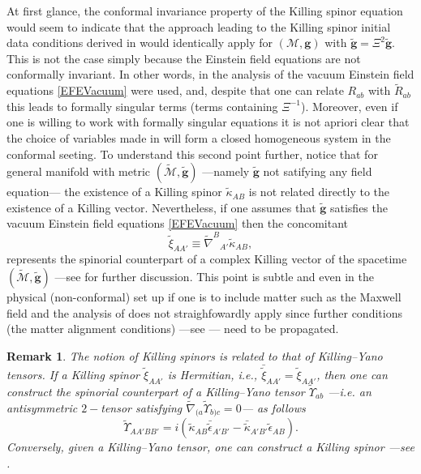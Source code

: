 \documentclass[10pt,a4paper]{article}
\theoremstyle{plain}
\newtheorem{remark}{Remark}
\def\bmg{{\bm g}}
\newcounter{mnotecount}%
\newcommand{\mnotex}[1]%
{\protect{\stepcounter{mnotecount}}$^{\mbox{\footnotesize $\bullet$\themnotecount}}$ 
\marginpar{%
\raggedright\tiny\em
$\!\!\!\!\!\!\,\bullet$\themnotecount: #1} }
\begin{document}
{\medskip

At first glance, the conformal invariance property of the
Killing spinor equation would seem to indicate that the
approach leading to the Killing spinor initial data conditions derived
in \cite{GarVal08c} would identically apply for $(\mathcal{M},\bmg)$
with $\tilde\bmg=\Xi^2\tilde{\bmg}$. This is not the case simply
because the Einstein field equations are not conformally invariant.
In other words, in the analysis of \cite{GarVal08c} the vacuum
Einstein field equations \eqref{EFEVacuum}
were used, and, despite
that one can relate $R_{ab}$ with $\tilde{R}_{ab}$ this leads to
formally singular terms (terms containing $\Xi^{-1}$). Moreover, even if one
is willing to work with formally singular equations it is not apriori clear
that the choice of variables made in \cite{GarVal08c} will form a
closed homogeneous system in the conformal seeting.  To understand
this second point further, notice that for general manifold with
metric $(\tilde{\mathcal{M}},\tilde{\bmg})$ ---namely $\tilde{\bmg}$
not satifying any field equation--- the existence of a Killing spinor
$\tilde{\kappa}_{AB}$ is not related directly to the existence of a
Killing vector.
Nevertheless, if one assumes that $\tilde{\bmg}$
satisfies the vacuum Einstein field equations \eqref{EFEVacuum} then
the concomitant
\begin{equation*}
\tilde{\xi}_{AA'} \equiv \tilde{\nabla}^{B}{}_{A'}\tilde{\kappa}_{AB},
\end{equation*}
represents the spinorial counterpart of a complex Killing vector of
the spacetime $(\tilde{\mathcal{M}},\tilde{\bmg})$ ---see
\cite{GarVal08c} for further discussion. This point is subtle and even
in the physical (non-conformal) set up if one is to include matter
such as the Maxwell field and the analysis of \cite{GarVal08c} does
not straighfowardly apply since further conditions (the matter
alignment conditions) ---see \cite{ValCol16}--- need to be propagated.
}


\begin{remark}
  \emph{
  The notion of Killing spinors is related to that
  of Killing--Yano tensors. If a Killing spinor
$\tilde{\xi}_{AA'}$ is Hermitian, i.e.,
$\bar{\tilde{\xi}}_{AA'}=\tilde{\xi}_{AA'}$, then one can construct the
spinorial counterpart of a \emph{Killing--Yano tensor}
$\tilde{\Upsilon}_{ab}$ ---i.e. an antisymmetric $2-$tensor satisfying
$\tilde{\nabla}_{(a}\tilde{\Upsilon}_{b)c}=0$--- as follows
\[\tilde{\Upsilon}_{AA'BB'}=i(\tilde{\kappa}_{AB}\bar{\tilde{\epsilon}}_{A'B'}
-\bar{\tilde{\kappa}}_{A'B'}\tilde{\epsilon}_{AB}).\] Conversely,
given a Killing--Yano tensor, one can construct a Killing spinor
---see \cite{ValCol16,McLBer93,PenRin86}.}
\end{remark}
\end{document}
